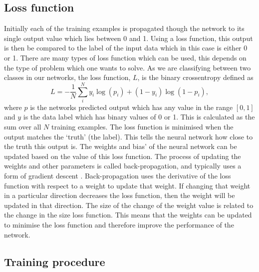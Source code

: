 \subsection{Loss function}

%
Initially each of the training examples is propagated though the network to its single output value which lies between 0 and 1. Using a loss function, this output is then be compared to
the label of the input data which in this case is either 0 or 1. There are many types of loss function which can be used, this depends on the type of problem which one wants to solve. As we are classifying
between two classes in our networks, the loss function, $L$, is the binary
crossentropy defined as
%
\begin{equation}\label{cnn:loss} 
L = -\frac{1}{N} \sum_{i}^{N} y_i\log{(p_i)} + (1-y_i)\log{(1-p_i)},
\end{equation}
%
where $p$ is the networks predicted output which has any value in the range $[0,1]$ and $y$ is the data label which has binary values of 0 or 1. This is calculated as the sum over all $N$ training examples. 
The loss function is minimised when the output matches the `truth' (the label). This
tells the neural network how close to the truth this output is. The weights and bias' of
the neural network can be updated based on the value of this loss function. The
process of updating the weights and other parameters is called back-propagation,
and typically uses a form of gradient descent
\cite{kingma2015AdamMethod}.
Back-propagation uses the derivative of the loss function with respect to a weight to update that weight.
If changing that weight in a particular direction decreases the loss function, then the weight will be updated in that direction.
The size of the change of the weight value is related to the change in the size loss function.
This means that the weights can be updated to minimise the loss function and therefore improve the performance of the network.

\subsection{Training procedure}

